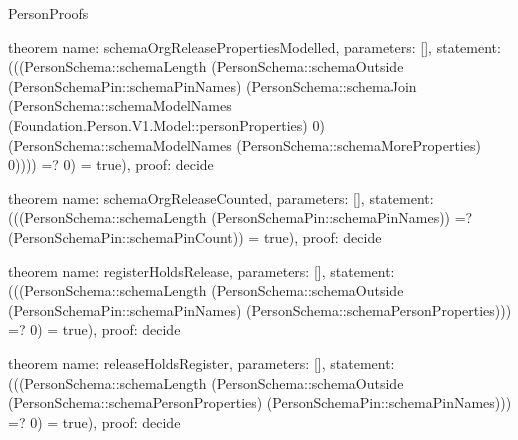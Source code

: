 \begin{lexlean}{PersonProofs}
\begin{semanticmodule}
theorem{
  name: schemaOrgReleasePropertiesModelled,
  parameters: [],
  statement: (((PersonSchema::schemaLength (PersonSchema::schemaOutside (PersonSchemaPin::schemaPinNames) (PersonSchema::schemaJoin (PersonSchema::schemaModelNames (Foundation.Person.V1.Model::personProperties) 0) (PersonSchema::schemaModelNames (PersonSchema::schemaMoreProperties) 0)))) =? 0) = true),
  proof: decide{}
}

theorem{
  name: schemaOrgReleaseCounted,
  parameters: [],
  statement: (((PersonSchema::schemaLength (PersonSchemaPin::schemaPinNames)) =? (PersonSchemaPin::schemaPinCount)) = true),
  proof: decide{}
}

theorem{
  name: registerHoldsRelease,
  parameters: [],
  statement: (((PersonSchema::schemaLength (PersonSchema::schemaOutside (PersonSchemaPin::schemaPinNames) (PersonSchema::schemaPersonProperties))) =? 0) = true),
  proof: decide{}
}

theorem{
  name: releaseHoldsRegister,
  parameters: [],
  statement: (((PersonSchema::schemaLength (PersonSchema::schemaOutside (PersonSchema::schemaPersonProperties) (PersonSchemaPin::schemaPinNames))) =? 0) = true),
  proof: decide{}
}
\end{semanticmodule}
\end{lexlean}
